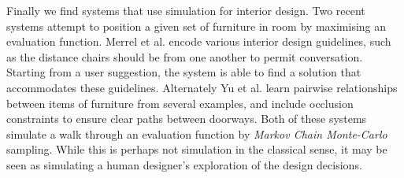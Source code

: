 Finally we find systems that use simulation for interior design. Two recent systems attempt to position a given set of furniture in room by maximising an evaluation function. Merrel et al.\cite{Merrell11} encode various interior design guidelines, such as the  distance chairs should be from one another to permit conversation. Starting from a user suggestion, the system is able to find a solution that accommodates these guidelines. Alternately Yu et al.\cite{Yu11} learn pairwise relationships between items of furniture from several examples, and include occlusion constraints to ensure clear paths between doorways. Both of these systems simulate a walk through an evaluation function by \emph{Markov Chain Monte-Carlo} sampling. While this is perhaps not simulation in the classical sense, it may be seen as simulating a human designer's exploration of the design decisions.






